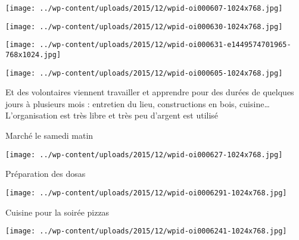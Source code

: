  

\begin{center} \texttt{[image: ../wp-content/uploads/2015/12/wpid-oi000607-1024x768.jpg]} \end{center}

 

 

\begin{center} \texttt{[image: ../wp-content/uploads/2015/12/wpid-oi000630-1024x768.jpg]} \end{center}

 

 

\begin{center} \texttt{[image: ../wp-content/uploads/2015/12/wpid-oi000631-e1449574701965-768x1024.jpg]} \end{center}

 

 

\begin{center} \texttt{[image: ../wp-content/uploads/2015/12/wpid-oi000605-1024x768.jpg]} \end{center}

 

 Et des volontaires viennent travailler et apprendre pour des durées de quelques jours à plusieurs mois : entretien du lieu, constructions en bois, cuisine… L'organisation est très libre et très peu d'argent est utilisé 

 Marché le samedi matin 

 

\begin{center} \texttt{[image: ../wp-content/uploads/2015/12/wpid-oi000627-1024x768.jpg]} \end{center}

 

 Préparation des dosas 

 

\begin{center} \texttt{[image: ../wp-content/uploads/2015/12/wpid-oi0006291-1024x768.jpg]} \end{center}

 

 Cuisine pour la soirée pizzas 

 

\begin{center} \texttt{[image: ../wp-content/uploads/2015/12/wpid-oi0006241-1024x768.jpg]} \end{center}

